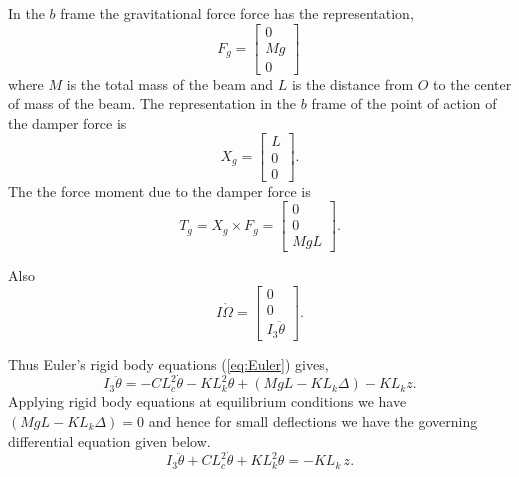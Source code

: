 \documentclass[graybox,envcountchap,sectrefs]{svmonoMuga}
\begin{document}
In the $b$ frame the gravitational force force has the representation,
\begin{equation}
F_g=\left[\begin{array}{c}
0\\
Mg\\
0\end{array}\right]\,
\end{equation}
where $M$ is the total mass of the beam and $L$ is the distance from $O$ to the center of mass of the beam.
The representation in the $b$ frame of the point of action of the damper force is
\[
X_g=\left[\begin{array}{c}
L\\
0\\
0\end{array}\right].
\]
The the force moment due to the damper force is
\begin{equation}
T_g=X_g\times F_g
=\left[\begin{array}{c}
0\\
0\\
MgL\end{array}\right].
\end{equation}








Also
\[
I\dot{\Omega}=\left[\begin{array}{c}
0\\
0\\
I_3\ddot{\theta}\end{array}\right].
\]

Thus Euler's rigid body equations (\ref{eq:Euler}) gives,\\
\begin{equation}
I_3\ddot{\theta}=-CL_c^2\dot{\theta}-KL_k^2\theta+(MgL-KL_k\Delta)-KL_kz.
\end{equation}
Applying rigid body equations at equilibrium conditions we have
$(MgL-KL_k\Delta)=0$ and hence for small deflections
we have the governing differential equation given below.
\begin{equation}
I_3\ddot{\theta}+CL_c^2\dot{\theta}+KL_k^2\theta =-KL_k\,z.
\end{equation}
\end{document}
